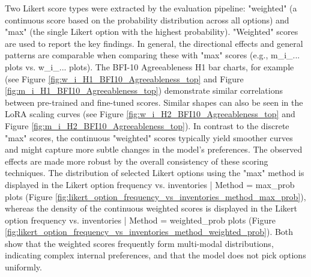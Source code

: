 \documentclass{DESSThesis}
\begin{document}
Two Likert score types were extracted by the evaluation pipeline: "weighted" (a continuous score based on the probability distribution across all options) and "max" (the single Likert option with the highest probability). "Weighted" scores are used to report the key findings. In general, the directional effects and general patterns are comparable when comparing these with "max" scores (e.g., m\_i\_... plots vs. w\_i\_... plots). The BFI-10 Agreeableness H1 bar charts, for example (see Figure \ref{fig:w_i_H1_BFI10_Agreeableness_top} and Figure \ref{fig:m_i_H1_BFI10_Agreeableness_top}) demonstrate similar correlations between pre-trained and fine-tuned scores. Similar shapes can also be seen in the LoRA scaling curves (see Figure \ref{fig:w_i_H2_BFI10_Agreeableness_top} and Figure \ref{fig:m_i_H2_BFI10_Agreeableness_top}). In contrast to the discrete "max" scores, the continuous "weighted" scores typically yield smoother curves and might capture more subtle changes in the model's preferences. The observed effects are made more robust by the overall consistency of these scoring techniques. The distribution of selected Likert options using the "max" method is displayed in the Likert option frequency vs. inventories | Method = max\_prob plots (Figure \ref{fig:likert_option_frequency_vs_inventories_method_max_prob}), whereas the density of the continuous weighted scores is displayed in the Likert option frequency vs. inventories | Method = weighted\_prob plots (Figure \ref{fig:likert_option_frequency_vs_inventories_method_weighted_prob}). Both show that the weighted scores frequently form multi-modal distributions, indicating complex internal preferences, and that the model does not pick options uniformly.
\end{document}
